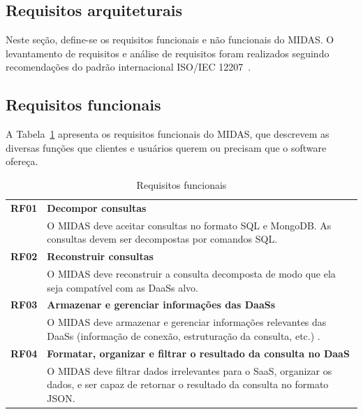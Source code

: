 \documentclass[11pt,a4paper]{article}
\begin{document}
\newpage
\subsection{Requisitos arquiteturais}
\label{subsec:ra}
Neste seção, define-se os requisitos funcionais e não funcionais do MIDAS. O levantamento de requisitos e análise de requisitos foram realizados seguindo recomendações do padrão internacional ISO/IEC 12207~\cite{ISOIEC21207}.  


\subsection*{Requisitos funcionais}

A Tabela~\ref{tab:rf} apresenta os requisitos funcionais do MIDAS, que descrevem as diversas funções que clientes e usuários querem ou precisam que o software ofereça.

\begin{table}[htb]
\centering
\caption{Requisitos funcionais} \label{tab:rf}
\begin{tabular*}{\linewidth}{@{\extracolsep{\fill}}|r p{13cm}|}    \hline
\textbf{RF01} 	& \textbf{Decompor consultas}\\ \cline{2-2}
 				& O MIDAS deve aceitar consultas no formato SQL e MongoDB. As consultas devem ser decompostas por comandos SQL.  \\\hline
\textbf{RF02} 	& \textbf{Reconstruir consultas}\\ \cline{2-2}
 				& O MIDAS deve reconstruir a consulta decomposta de modo que ela seja compatível com as DaaSs alvo.   \\ \hline
\textbf{RF03} 	& \textbf{Armazenar e gerenciar informações das DaaSs}\\ \cline{2-2}
 				& O MIDAS deve armazenar e gerenciar informações relevantes das DaaSs (informação de conexão, estruturação da consulta, etc.) .  \\ \hline
 \textbf{RF04} 	& \textbf{Formatar, organizar e filtrar o resultado da consulta no DaaS}\\ \cline{2-2}
 				& O MIDAS deve filtrar dados irrelevantes para o SaaS, organizar os dados,  e ser capaz de retornar o resultado da consulta no formato JSON.  \\ \hline
\end{tabular*}
\end{table}
\end{document}
